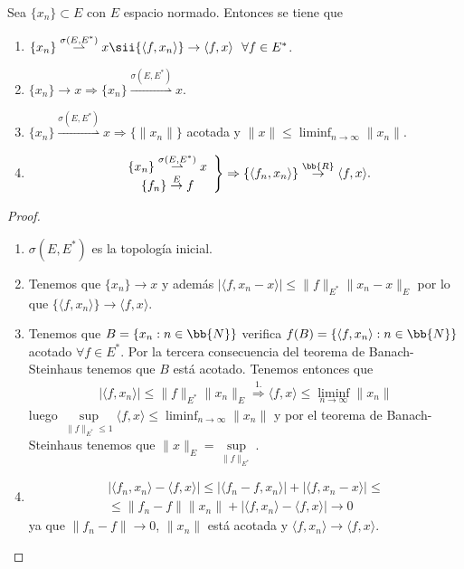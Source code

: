 \begin{prop}
    Sea $\{x_n\}\subset E$ con $E$ espacio normado. Entonces se tiene que 
    \begin{enumerate}
        \item $\{x_n\} \overset{\sigma(E, E^*)}{\rightharpoonup} x \sii \{\langle f,x_n \rangle \} \to \langle f,x\rangle \ \ \forall f \in E^*$.
        \item $\{x_n\} \to x \Rightarrow \{x_n\} \overset{\sigma(E,E^*)}{\rightharpoonup} x$.
        \item $\{x_n\} \overset{\sigma(E,E^*)}{\rightharpoonup} x \Rightarrow \{\|x_n\|\}$ acotada y $\|x\| \leq \liminf_{n\to\infty} \|x_n\|$.
        \item \begin{gather*}
            \left.
                \begin{array}{c}
                    \{x_n\} \overset{\sigma(E, E^*)}{\rightharpoonup} x\\
                    \{f_n\} \overset{E}{\to} f
                \end{array}
            \right\} \Rightarrow \{\langle f_n, x_n \rangle\} \overset{\bb{R}}{\to} \langle f,x \rangle.
        \end{gather*} 
    \end{enumerate}
    \begin{proof}\
        \begin{enumerate}
            \item $\sigma(E,E^*)$ es la topología inicial.
            \item Tenemos que $\{x_n\}\to x$ y además $|\langle f,x_n-x\rangle | \leq \|f\|_{E^*} \|x_n-x\|_{E}$ por lo que $\{\langle f,x_n \rangle\} \to \langle f,x \rangle$.
            \item Tenemos que $B=\{x_n : n\in \bb{N}\}$ verifica $f(B)=\{\langle f,x_n \rangle : n\in \bb{N}\}$ acotado $\forall f \in E^*$. Por la tercera consecuencia del teorema de Banach-Steinhaus tenemos que $B$ está acotado. Tenemos entonces que
            \begin{gather*}
                |\langle f,x_n \rangle| \leq \|f\|_{E^*} \|x_n\|_E \overset{1.}{\Longrightarrow} \langle f,x \rangle \leq \liminf_{n\to\infty} \|x_n\|
            \end{gather*}
            luego $\sup\limits_{\|f\|_{E^*}\leq 1} \langle f,x \rangle \leq \liminf_{n\to\infty} \|x_n\|$ y por el teorema de Banach-Steinhaus tenemos que $\|x\|_E = \sup\limits_{\|f\|_{E^*}}$.

            \item \begin{gather*}
                |\langle f_n,x_n\rangle  - \langle f,x \rangle | \leq | \langle f_n-f, x_n \rangle| + |\langle f,x_n-x\rangle| \leq \\
                \leq \|f_n-f\| \|x_n\| + |\langle f,x_n\rangle - \langle f,x \rangle | \to 0
            \end{gather*}
            ya que $\|f_n-f\| \to 0$, $\|x_n\|$ está acotada y $\langle f,x_n\rangle \to \langle f,x \rangle$.
        \end{enumerate}
    \end{proof}
\end{prop}